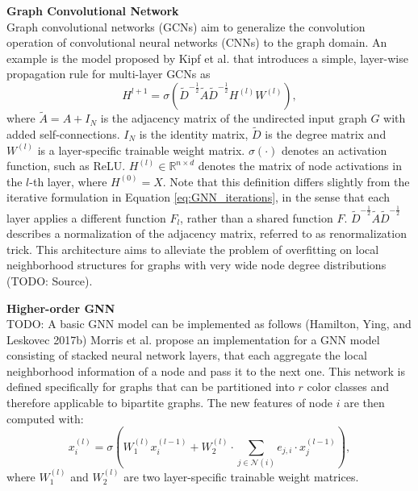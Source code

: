 \textbf{Graph Convolutional Network} \\
Graph convolutional networks (GCNs) aim to generalize the convolution operation of convolutional neural networks (CNNs) to the graph domain. An example is the model proposed by Kipf et al. \cite{kipf2016semi} that introduces a simple, layer-wise propagation rule for multi-layer GCNs as
\begin{equation}
    \label{eq:GCN}
    H^{l+1} = \sigma(\tilde{D}^{-\frac{1}{2}}\tilde{A}\tilde{D}^{-\frac{1}{2}}H^{(l)}W^{(l)}),
\end{equation}
where $\tilde{A} = A + I_N$ is the adjacency matrix of the undirected input graph $G$ with added self-connections. $I_N$ is the identity matrix, $\tilde{D}$ is the degree matrix and $W^{(l)}$ is a layer-specific trainable weight matrix. $\sigma(\cdot)$ denotes an activation function, such as ReLU. $H^{(l)} \in \mathbb{R}^{n\times d}$ denotes the matrix of node activations in the $l$-th layer, where $H^{(0)} = X$. Note that this definition differs slightly from the iterative formulation in Equation \ref{eq:GNN_iterations}, in the sense that each layer applies a different function $F_l$, rather than a shared function $F$. $\tilde{D}^{-\frac{1}{2}}\tilde{A}\tilde{D}^{-\frac{1}{2}}$ describes a normalization of the adjacency matrix, referred to as renormalization trick. This architecture aims to alleviate the problem of overfitting on local neighborhood structures for graphs with very wide node degree distributions (TODO: Source).


\textbf{Higher-order GNN} \\
TODO: A basic GNN model can be implemented as follows (Hamilton, Ying, and Leskovec 2017b)
Morris et al. \cite{morris2019weisfeiler} propose an implementation for a GNN model consisting of stacked neural network layers, that each aggregate the local neighborhood information of a node and pass it to the next one. This network is defined specifically for graphs that can be partitioned into $r$ color classes and therefore applicable to bipartite graphs. The new features of node $i$ are then computed with:
\begin{equation}
    \label{eq:higher-order-gnn}
    x_i^{(l)} = \sigma(W_1^{(l)}x_i^{(l-1)}+W_2^{(l)}\cdot\sum_{j\in\mathcal{N}(i)}e_{j,i}\cdot x_j^{(l-1)}),
\end{equation}
where $W_1^{(l)}$ and $W_2^{(l)}$ are two layer-specific trainable weight matrices.

